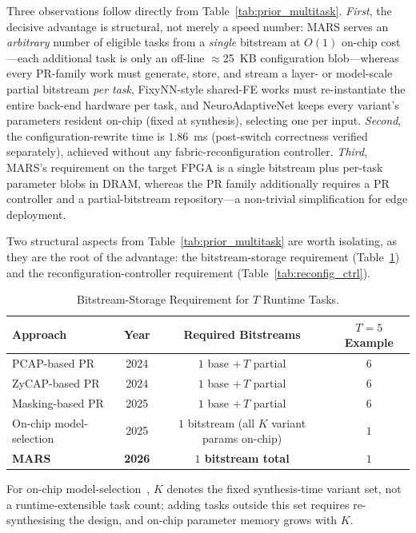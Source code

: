 \documentclass[12pt, a4paper]{report}
\numberwithin{equation}{chapter}
\numberwithin{figure}{chapter}
\numberwithin{table}{chapter}
\numberwithin{algorithm}{chapter}
\begin{document}
Three observations follow directly from Table~\ref{tab:prior_multitask}. \emph{First}, the decisive advantage is structural, not merely a speed number: MARS serves an \emph{arbitrary} number of eligible tasks from a \emph{single} bitstream at $O(1)$ on-chip cost---each additional task is only an off-line $\approx$25~KB configuration blob---whereas every PR-family work must generate, store, and stream a layer- or model-scale partial bitstream \emph{per task}, FixyNN-style shared-FE works must re-instantiate the entire back-end hardware per task, and NeuroAdaptiveNet keeps every variant's parameters resident on-chip (fixed at synthesis), selecting one per input. \emph{Second}, the configuration-rewrite time is $1.86$~ms (post-switch correctness verified separately), achieved without any fabric-reconfiguration controller. \emph{Third}, MARS's requirement on the target FPGA is a single bitstream plus per-task parameter blobs in DRAM, whereas the PR family additionally requires a PR controller and a partial-bitstream repository---a non-trivial simplification for edge deployment.

Two structural aspects from Table~\ref{tab:prior_multitask} are worth isolating, as they are the root of the advantage: the bitstream-storage requirement (Table~\ref{tab:bitstream_count}) and the reconfiguration-controller requirement (Table~\ref{tab:reconfig_ctrl}).

\begin{table}[H]
\centering
\caption{Bitstream-Storage Requirement for $T$ Runtime Tasks.}
\label{tab:bitstream_count}
\begin{tabular}{lccc}
\toprule
\textbf{Approach} & \textbf{Year} & \textbf{Required Bitstreams} & \textbf{$T{=}5$ Example} \\
\midrule
PCAP-based PR~\cite{Huang2024ACNNE}                & 2024 & $1$ base $+\,T$ partial & $6$ \\
ZyCAP-based PR~\cite{Rangsikunpum2024CoarseToFine} & 2024 & $1$ base $+\,T$ partial & $6$ \\
Masking-based PR~\cite{Kang2025RuntimeRobust}      & 2025 & $1$ base $+\,T$ partial & $6$ \\
On-chip model-selection~\cite{ElBouazzaoui2025NeuroAdaptive} & 2025 & \makecell[l]{$1$ bitstream\\(all $K$ variant params on-chip)} & $1$ \\
\textbf{MARS} & \textbf{2026} & \textbf{$1$ bitstream total} & \textbf{$1$} \\
\bottomrule
\end{tabular}
\begin{flushleft}
\footnotesize For on-chip model-selection~\cite{ElBouazzaoui2025NeuroAdaptive}, $K$ denotes the fixed synthesis-time variant set, not a runtime-extensible task count; adding tasks outside this set requires re-synthesising the design, and on-chip parameter memory grows with $K$.
\end{flushleft}
\end{table}
\end{document}
